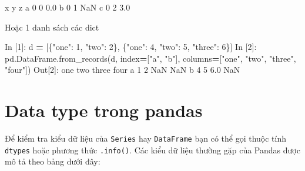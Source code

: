 \documentclass[
]{book}
\newenvironment{Shaded}{\begin{snugshade}}{\end{snugshade}}
\newcommand{\DecValTok}[1]{\textcolor[rgb]{0.00,0.00,0.81}{#1}}
\newcommand{\FloatTok}[1]{\textcolor[rgb]{0.00,0.00,0.81}{#1}}
\newcommand{\NormalTok}[1]{#1}
\newcommand{\OperatorTok}[1]{\textcolor[rgb]{0.81,0.36,0.00}{\textbf{#1}}}
\newcommand{\StringTok}[1]{\textcolor[rgb]{0.31,0.60,0.02}{#1}}
\begin{document}
\begin{Shaded}
\begin{Highlighting}[]
\NormalTok{   x  y    z}
\NormalTok{a  }\DecValTok{0}  \DecValTok{0}  \FloatTok{0.0}
\NormalTok{b  }\DecValTok{0}  \DecValTok{1}\NormalTok{  NaN}
\NormalTok{c  }\DecValTok{0}  \DecValTok{2}  \FloatTok{3.0}
\end{Highlighting}
\end{Shaded}

Hoặc 1 danh sách các dict

\begin{Shaded}
\begin{Highlighting}[]
\NormalTok{In [}\DecValTok{1}\NormalTok{]: d }\OperatorTok{=}\NormalTok{ [\{}\StringTok{"one"}\NormalTok{: }\DecValTok{1}\NormalTok{, }\StringTok{"two"}\NormalTok{: }\DecValTok{2}\NormalTok{\}, \{}\StringTok{"one"}\NormalTok{: }\DecValTok{4}\NormalTok{, }\StringTok{"two"}\NormalTok{: }\DecValTok{5}\NormalTok{, }\StringTok{"three"}\NormalTok{: }\DecValTok{6}\NormalTok{\}]}
\NormalTok{In [}\DecValTok{2}\NormalTok{]: pd.DataFrame.from\_records(d, index}\OperatorTok{=}\NormalTok{[}\StringTok{"a"}\NormalTok{, }\StringTok{"b"}\NormalTok{], columns}\OperatorTok{=}\NormalTok{[}\StringTok{"one"}\NormalTok{, }\StringTok{"two"}\NormalTok{, }\StringTok{"three"}\NormalTok{, }\StringTok{"four"}\NormalTok{])}
\NormalTok{Out[}\DecValTok{2}\NormalTok{]:}
\NormalTok{   one  two  three  four}
\NormalTok{a    }\DecValTok{1}    \DecValTok{2}\NormalTok{    NaN   NaN}
\NormalTok{b    }\DecValTok{4}    \DecValTok{5}    \FloatTok{6.0}\NormalTok{   NaN}
\end{Highlighting}
\end{Shaded}

\hypertarget{data-type-trong-pandas}{%
\section{Data type trong pandas}\label{data-type-trong-pandas}}

Để kiểm tra kiểu dữ liệu của \texttt{Series} hay \texttt{DataFrame} bạn có thể gọi thuộc tính \texttt{dtypes} hoặc phương thức \texttt{.info()}.
Các kiểu dữ liệu thường gặp của Pandas được mô tả theo bảng dưới đây:
\end{document}
